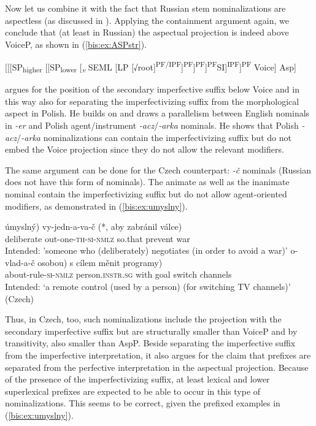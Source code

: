 \documentclass[output=paper]{langscibook}
\begin{document}
\noindent Now let us combine it with the fact that Russian stem nominalizations are aspectless (as discussed in ). Applying the containment argument again, we conclude that (at least in Russian) the aspectual projection is indeed above VoiceP, as shown in (\ref{bis:ex:ASPstr}). 

\ea\label{bis:ex:ASPstr}	
[[[SP\textsubscript{higher} [[SP\textsubscript{lower} [\textsubscript{\textit{v}} SEML [LP [√root]\textsuperscript{PF/IPF}]\textsuperscript{PF}]\textsuperscript{PF}]\textsuperscript{PF}SI]\textsuperscript{IPF}]\textsuperscript{PF} Voice] Asp]
\medskip\\
\z

\noindent \citet{Kwapiszewski2021} argues for the position of the secondary imperfective suffix below Voice and in this way also for separating the imperfectivizing suffix from the morphological aspect in Polish. He builds on \citet{Baker.Vinokurova2009} and draws a parallelism between English nominals in \textit{-er} and Polish agent/instrument \textit{-acz}/\textit{-arka} nominals. He shows that Polish \textit{-acz}/\textit{-arka} nominalizations can contain the imperfectivizing suffix but do not embed the Voice projection since they do not allow the relevant modifiers.

The same argument can be done for the Czech counterpart: \textit{-č} nominals (Russian does not have this form of nominals). The animate as well as the inanimate nominal contain the imperfectivizing suffix but do not allow agent-oriented modifiers, as demonstrated in (\ref{bis:ex:umyslny}).

\ea\label{bis:ex:umyslny}
\ea\label{bis:ex:umyslnyA}
\gll 
\minsp{(*} úmyslný)	vy-jedn-a-va-č (*, aby zabránil válce) \\
{} deliberate out-one-\textsc{th}-\textsc{si}-\textsc{nmlz} {} so.that	prevent war \\
\glt Intended: 'someone who (deliberately) negotiates (in order to avoid a war)' 
\ex\label{bis:ex:ovladacB}
\gll 
o-vlad-a-č \minsp{(*} osobou)	 \minsp{(*} s 			cílem 	měnit 	programy) \\
about-rule-\textsc{si}-\textsc{nmlz} {} person.\textsc{instr.sg} {} with	goal		switch	channels \\
\glt Intended: ‘a remote control (used by a person) (for switching TV channels)’	
\hfill (Czech)
\z
\z

\noindent Thus, in Czech, too, such nominalizations include the projection with the secondary imperfective suffix but are structurally smaller than VoiceP and by transitivity, also smaller than AspP. Beside separating the imperfective suffix from the imperfective interpretation, it also argues for the claim that prefixes are separated from the perfective interpretation in the aspectual projection. Because of the presence of the imperfectivizing suffix, at least lexical and lower superlexical prefixes are expected to be able to occur in this type of nominalizations. This seems to be correct, given the prefixed examples in (\ref{bis:ex:umyslny}).
\end{document}
